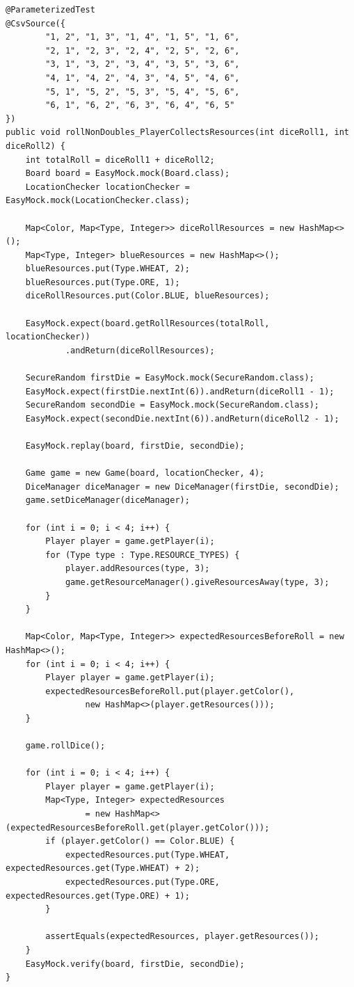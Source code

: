 \documentclass{fank1basedocument}
\begin{document}
\begin{lstlisting}[style=javacode,language=myJava]
@ParameterizedTest
@CsvSource({
		"1, 2", "1, 3", "1, 4", "1, 5", "1, 6",
		"2, 1", "2, 3", "2, 4", "2, 5", "2, 6",
		"3, 1", "3, 2", "3, 4", "3, 5", "3, 6",
		"4, 1", "4, 2", "4, 3", "4, 5", "4, 6",
		"5, 1", "5, 2", "5, 3", "5, 4", "5, 6",
		"6, 1", "6, 2", "6, 3", "6, 4", "6, 5"
})
public void rollNonDoubles_PlayerCollectsResources(int diceRoll1, int diceRoll2) {
	int totalRoll = diceRoll1 + diceRoll2;
	Board board = EasyMock.mock(Board.class);
	LocationChecker locationChecker = EasyMock.mock(LocationChecker.class);
	
	Map<Color, Map<Type, Integer>> diceRollResources = new HashMap<>();
	Map<Type, Integer> blueResources = new HashMap<>();
	blueResources.put(Type.WHEAT, 2);
	blueResources.put(Type.ORE, 1);
	diceRollResources.put(Color.BLUE, blueResources);

	EasyMock.expect(board.getRollResources(totalRoll, locationChecker))
			.andReturn(diceRollResources);

	SecureRandom firstDie = EasyMock.mock(SecureRandom.class);
	EasyMock.expect(firstDie.nextInt(6)).andReturn(diceRoll1 - 1);
	SecureRandom secondDie = EasyMock.mock(SecureRandom.class);
	EasyMock.expect(secondDie.nextInt(6)).andReturn(diceRoll2 - 1);

	EasyMock.replay(board, firstDie, secondDie);

	Game game = new Game(board, locationChecker, 4);
	DiceManager diceManager = new DiceManager(firstDie, secondDie);
	game.setDiceManager(diceManager);

	for (int i = 0; i < 4; i++) {
		Player player = game.getPlayer(i);
		for (Type type : Type.RESOURCE_TYPES) {
			player.addResources(type, 3);
			game.getResourceManager().giveResourcesAway(type, 3);
		}
	}

	Map<Color, Map<Type, Integer>> expectedResourcesBeforeRoll = new HashMap<>();
	for (int i = 0; i < 4; i++) {
		Player player = game.getPlayer(i);
		expectedResourcesBeforeRoll.put(player.getColor(),
				new HashMap<>(player.getResources()));
	}

	game.rollDice();

	for (int i = 0; i < 4; i++) {
		Player player = game.getPlayer(i);
		Map<Type, Integer> expectedResources
				= new HashMap<>(expectedResourcesBeforeRoll.get(player.getColor()));
		if (player.getColor() == Color.BLUE) {
			expectedResources.put(Type.WHEAT, expectedResources.get(Type.WHEAT) + 2);
			expectedResources.put(Type.ORE, expectedResources.get(Type.ORE) + 1);
		}
		
		assertEquals(expectedResources, player.getResources());
	}
	EasyMock.verify(board, firstDie, secondDie);
}
\end{lstlisting}
\end{document}
